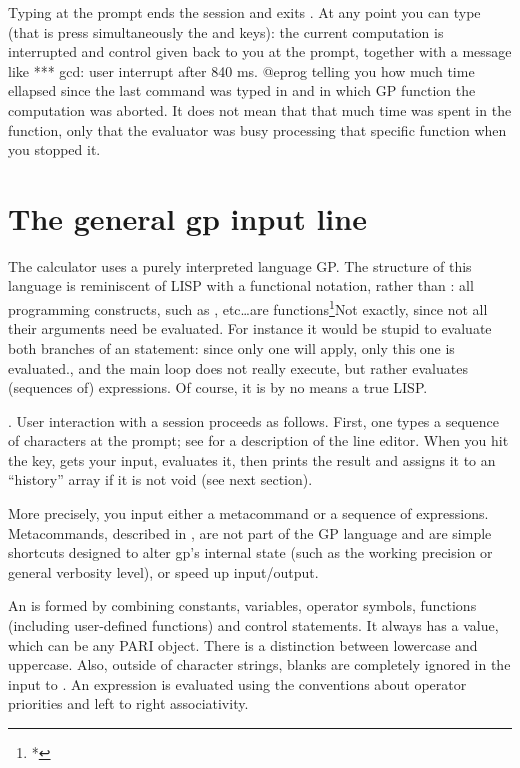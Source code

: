 
Typing  at the prompt ends the session and exits . At any
point you can type  (that is press simultaneously the
 and  keys): the current computation is interrupted and
control given back to you at the  prompt, together with a message
like
\bprog
  *** gcd: user interrupt after 840 ms.
@eprog\noindent
telling you how much time ellapsed since the last command was typed in and
in which GP function the computation was aborted. It does not mean that that
much time was spent in the function, only that the evaluator was busy
processing that specific function when you stopped it.

\section{The general gp input line}

The  calculator uses a purely interpreted language GP. The structure
of this language is reminiscent of LISP with a functional notation,
 rather than : all programming constructs,
such as ,  etc\dots are functions\footnote{*}{Not exactly,
since not all their arguments need be evaluated. For instance it would be
stupid to evaluate both branches of an  statement: since only one
will apply, only this one is evaluated.}, and the main loop does not really
execute, but rather evaluates (sequences of) expressions. Of course, it is by
no means a true LISP.

. User interaction with a  session proceeds as
follows. First, one types a sequence of characters at the  prompt;
see  for a description of the line editor. When you hit
the  key,  gets your input, evaluates it, then prints
the result and assigns it to an ``history'' array if it is not void (see
next section).

More precisely, you input either a metacommand or a sequence of
expressions. Metacommands, described in , are not part of the
GP language and are simple shortcuts designed to alter gp's internal state
(such as the working precision or general verbosity level), or speed up
input/output.

An  is formed by combining
constants, variables, operator symbols, functions (including user-defined
functions) and control statements. It always has a value, which can be any
PARI object. There is a distinction between lowercase and uppercase. Also,
outside of character strings, blanks are completely ignored in the input to
. An expression is evaluated using the conventions about operator
priorities and left to right associativity.

